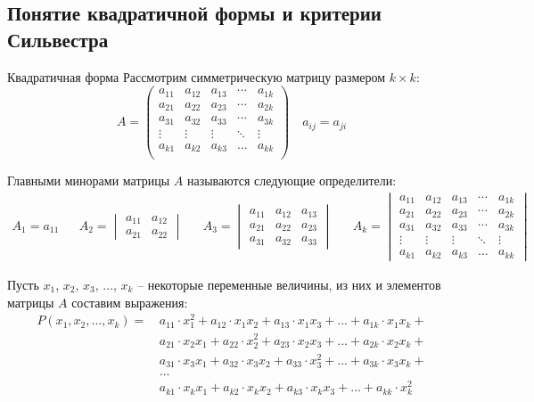 \subsection{Понятие квадратичной формы и критерии Сильвестра}

\begin{tbox}{Квадратичная форма}
	Рассмотрим симметрическую матрицу размером $k \times k$:
	\begin{equation*}
		A =
		\begin{pmatrix}
			a_{11} & a_{12} & a_{13} & \cdots & a_{1k} \\
			a_{21} & a_{22} & a_{23} & \cdots & a_{2k} \\
			a_{31} & a_{32} & a_{33} & \cdots & a_{3k} \\
			\vdots & \vdots & \vdots & \ddots & \vdots \\
			a_{k1} & a_{k2} & a_{k3} & \dots & a_{kk} \\
		\end{pmatrix}
		\quad a_{ij} = a_{ji}
	\end{equation*}

	Главными минорами матрицы $A$ называются следующие определители:
	\begin{align*}
		A_1 = a_{11} &&
		A_2 = \begin{vmatrix}
			a_{11} & a_{12} \\
			a_{21} & a_{22}
		\end{vmatrix} &&
		A_{3} = \begin{vmatrix}
			a_{11} & a_{12} & a_{13} \\
			a_{21} & a_{22} & a_{23} \\
			a_{31} & a_{32} & a_{33}
		\end{vmatrix} &&
		A_k = \begin{vmatrix}
			a_{11} & a_{12} & a_{13} & \cdots & a_{1k} \\
			a_{21} & a_{22} & a_{23} & \cdots & a_{2k} \\
			a_{31} & a_{32} & a_{33} & \cdots & a_{3k} \\
			\vdots & \vdots & \vdots & \ddots & \vdots \\
			a_{k1} & a_{k2} & a_{k3} & \dots  & a_{kk}
		\end{vmatrix}
	\end{align*}

	Пусть $x_1$, $x_2$, $x_3$, $\dots$, $x_k$ -- некоторые переменные величины, из них и элементов матрицы $A$ составим выражения:
	\begin{align*}
		P(x_1, x_2, \dots, x_k) = \,
		& a_{11} \cdot x_{1}^2 + a_{12} \cdot x_{1} x_{2} + a_{13} \cdot x_{1} x_{3} + ... + a_{1k} \cdot x_{1} x_{k} + \\
		&a_{21} \cdot x_{2} x_{1} + a_{22} \cdot x_{2}^2 + a_{23} \cdot x_{2} x_{3} + ... + a_{2k} \cdot x_{2} x_{k} + \\
		&a_{31} \cdot x_{3} x_{1} + a_{32} \cdot x_{3} x_{2} + a_{33} \cdot x_{3}^2 + ... + a_{3k} \cdot x_{3} x_{k} + \\
		&\dots\\
		&a_{k1} \cdot x_{k} x_{1} + a_{k2} \cdot x_{k} x_{2} + a_{k3} \cdot x_{k} x_{3} + ... + a_{kk} \cdot x_{k}^2
	\end{align*}


\end{tbox}
